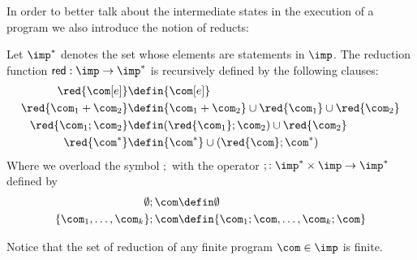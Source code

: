 
In order to better talk about the intermediate states in the execution
of a program we also introduce the notion of reducts:
\begin{definition}[Reducts]
  Let \(\imp^*\) denotes the set whose elements are statements in
  \(\imp\). The reduction function \(\mathsf{red} : \imp \to \imp^*\)
  is recursively defined by the following clauses:
  \begin{align*}
    \red{\com[e]} & \defin \{\com[e]\} \\
    \red{\com_1 + \com_2} & \defin \{\com_1 + \com_2\} \cup \red{\com_1} \cup \red{\com_2} \\
    \red{\com_1 ; \com_2} & \defin (\red{\com_1} ; \com_2) \cup \red{\com_2} \\
    \red{\com^*} & \defin \{\com^*\} \cup (\red{\com} ; \com^*)
  \end{align*}
  Where we overload the symbol \(\mathds{;}\) with the operator
  \(; : \imp^* \times \imp \to \imp^*\) defined by
  \begin{align*}
    \emptyset ; \com & \defin \emptyset \\
    \{\com_1, \dots, \com_k\} ; \com & \defin \{\com_1;\com, \dots, \com_k;\com\}
  \end{align*}
\end{definition}
\noindent
Notice that the set of reduction of any finite program \(\com\in\imp\)
is finite.
